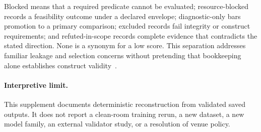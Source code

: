 Blocked means that a required predicate cannot be evaluated; resource-blocked records a feasibility outcome under a declared envelope; diagnostic-only bars promotion to a primary comparison; excluded records fail integrity or construct requirements; and refuted-in-scope records complete evidence that contradicts the stated direction. None is a synonym for a low score. This separation addresses familiar leakage and selection concerns without pretending that bookkeeping alone establishes construct validity~\cite{kaufman2012leakage,cawley2010selection,kapoor2023leakage,gorman2019splits}.

\paragraph{Interpretive limit.}
This supplement documents deterministic reconstruction from validated saved outputs. It does not report a clean-room training rerun, a new dataset, a new model family, an external validator study, or a resolution of venue policy.
